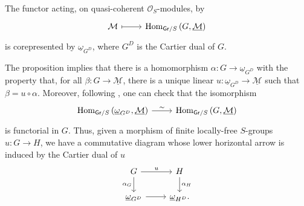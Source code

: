 \begin{prop}\label{prop:ReprhM}
	The functor acting, on quasi-coherent $\mathcal{O}_{ S }$-modules, by
	\begin{equation*}
	\begin{tikzcd}[row sep = 0ex
		,/tikz/column 1/.append style={anchor=base east}
		,/tikz/column 2/.append style={anchor=base west}]
		\mathcal{M} \arrow[r, "", mapsto] & 
		\Hom_{ \mathsf{Gr}/S } \left( G, \underline{\mathcal{M}} \right)
	\end{tikzcd}
	\end{equation*} 
	is corepresented by $\underline{\omega}_{G^D}$, where $G^D$ is
	the Cartier dual of $G$.
\end{prop}


\begin{rem}[]\label{rem:ReprMorExt}
	The proposition implies that there is
	a homomorphism $\alpha\colon G \to \underline{\omega}_{G^D}$
	with the property that, for all $\beta\colon G \to \underline{\mathcal{M}}$,
	there is a unique linear $u\colon \underline{\omega}_{G^D} \to \underline{\mathcal{M}}$
	such that $\beta = u \circ \alpha$.
	Moreover, following {\cite[Chapter IV, remark 1.6]{Messing}},
	one can check that the isomorphism
	\begin{equation*}
	\begin{tikzcd}[row sep = 0ex
		,/tikz/column 1/.append style={anchor=base east}
		,/tikz/column 2/.append style={anchor=base west}]
		\Hom_{\mathsf{Gr}/S} \left( \underline{\omega}_{G^D}, \underline{\mathcal{M}} \right)
		\arrow[r, "\sim", rightarrow] &
		\Hom_{\mathsf{Gr}/S} \left( G, \underline{\mathcal{M}} \right)
	\end{tikzcd}
	\end{equation*} 
	is functorial in $G$.
	Thus, given a morphism of finite locally-free $S$-groups $u\colon G \to H$,
	we have a commutative diagram whose lower horizontal arrow is
	induced by the Cartier dual of $u$
	\begin{equation}\label{diag:functorialityRepresent}
	\begin{tikzcd}
		G \arrow[r, "u", rightarrow] 
		\arrow[d, "\alpha_G"', rightarrow] &
		H \arrow[d, "\alpha_H", rightarrow] \\
		\underline{\omega}_{G^D} \arrow[r, "", rightarrow] &
		\underline{\omega}_{H^D}
	.\end{tikzcd}
	\end{equation}
\end{rem}


